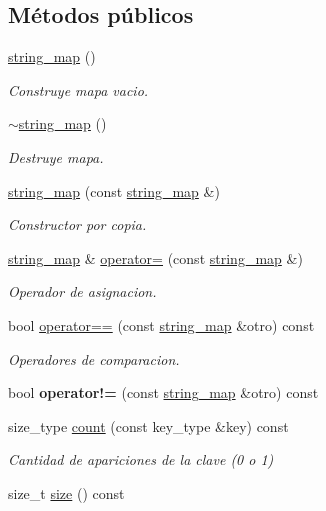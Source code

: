 \subsection*{Métodos públicos}
\begin{DoxyCompactItemize}
\item 
\hyperlink{classstring__map_acd7803d493b09db56e2e9022e526def7}{string\-\_\-map} ()
\begin{DoxyCompactList}\small\item\em Construye mapa vacio. \end{DoxyCompactList}\item 
\hyperlink{classstring__map_a37b201370c0a6a3c2aa488dedbc0a9d7}{$\sim$string\-\_\-map} ()
\begin{DoxyCompactList}\small\item\em Destruye mapa. \end{DoxyCompactList}\item 
\hyperlink{classstring__map_afa602ae4726c1dc0a562652107cdabfd}{string\-\_\-map} (const \hyperlink{classstring__map}{string\-\_\-map} \&)
\begin{DoxyCompactList}\small\item\em Constructor por copia. \end{DoxyCompactList}\item 
\hyperlink{classstring__map}{string\-\_\-map} \& \hyperlink{classstring__map_ac1223390aced968379ed9597649ef7fa}{operator=} (const \hyperlink{classstring__map}{string\-\_\-map} \&)
\begin{DoxyCompactList}\small\item\em Operador de asignacion. \end{DoxyCompactList}\item 
bool \hyperlink{classstring__map_a424a95ef628cc97aeedae51f98ee2345}{operator==} (const \hyperlink{classstring__map}{string\-\_\-map} \&otro) const 
\begin{DoxyCompactList}\small\item\em Operadores de comparacion. \end{DoxyCompactList}\item 
\hypertarget{classstring__map_aaa9e3e8289202b72f1b0b7b0268c3fe7}{bool {\bfseries operator!=} (const \hyperlink{classstring__map}{string\-\_\-map} \&otro) const }\label{classstring__map_aaa9e3e8289202b72f1b0b7b0268c3fe7}

\item 
size\-\_\-type \hyperlink{classstring__map_a1e80be652b6982f4a1149cc3853ef1c2}{count} (const key\-\_\-type \&key) const 
\begin{DoxyCompactList}\small\item\em Cantidad de apariciones de la clave (0 o 1) \end{DoxyCompactList}\item 
\hypertarget{classstring__map_af6a00aaeaf63ed9798c403e714a4be0c}{size\-\_\-t \hyperlink{classstring__map_af6a00aaeaf63ed9798c403e714a4be0c}{size} () const }\label{classstring__map_af6a00aaeaf63ed9798c403e714a4be0c}


\end{DoxyCompactItemize}
